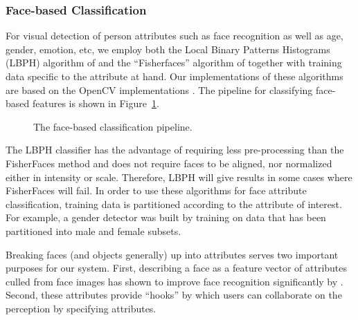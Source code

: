 \documentclass{llncs}
\begin{document}
\subsubsection{Face-based Classification}
For visual detection of person attributes such as face recognition as well as age, gender, emotion, etc, we employ both the Local Binary Patterns Histograms (LBPH) algorithm
of \citet{lbph} and the ``Fisherfaces'' algorithm of \citet{fisherfaces} together with training data specific to the attribute at hand. Our implementations of these algorithms are based
on the OpenCV implementations \citep{opencv}. The pipeline for classifying face-based features is shown in
Figure~\ref{fig:face_classifiers}.
\begin{figure}[t]
\caption{The face-based classification pipeline.}
\label{fig:face_classifiers}
\end{figure}
The LBPH classifier has the advantage of requiring less pre-processing than the FisherFaces method and does not require faces to be aligned,
nor normalized either in intensity or scale. Therefore, LBPH will give
results in some cases where FisherFaces will fail. In order to use
these algorithms for face attribute classification, training data is
partitioned according to the attribute of interest. For example, a
gender detector was built by training on data that has been
partitioned into male and female subsets.

Breaking faces (and objects generally) up into attributes serves two
important purposes for our system. First, describing a face as a
feature vector of attributes culled from face images has shown to
improve face recognition significantly by
\citet{Kumar09attributeand}. Second, these attributes provide
``hooks'' by which users can collaborate on the perception by
specifying attributes.
\end{document}
